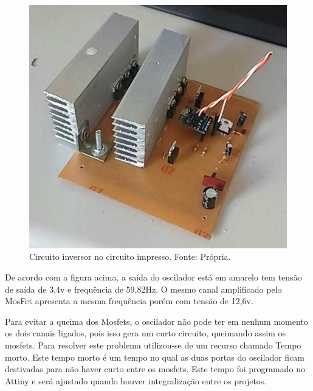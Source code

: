        \begin{figure}[!htb]
            \centering
            \includegraphics[scale= 0.4]{figuras/Inversor_pronto.jpg}
            \caption{Circuito inversor no circuito impresso. Fonte: Própria.}
            \label{inversor-pronto}
        \end{figure} 		
        
        De acordo com a figura acima, a saída do oscilador está em amarelo tem tensão 					de saída de 3,4v e frequência de 59,82Hz. O mesmo canal amplificado pelo 						MosFet apresenta a mesma frequência porém com tensão de 12,6v. 
        
        Para evitar a queima dos Mosfets, o oscilador não pode ter em nenhum momento 					os dois canais ligados, pois isso gera um curto circuito, queimando assim os 					mosfets. Para resolver este problema utilizou-se de um recurso chamado Tempo 					morto. Este tempo morto é um tempo no qual as duas portas do oscilador ficam 					destivadas para não haver curto entre os mosfets. Este tempo foi programado no 				Attiny e será ajustado quando houver integralização entre os projetos.           
        
